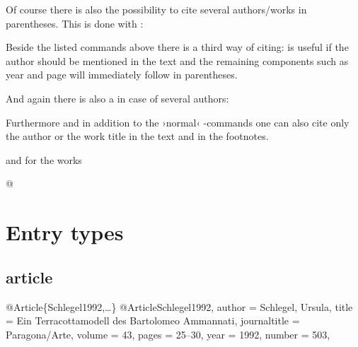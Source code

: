 \documentclass[a4paper,
10pt,
ngerman,
english
]{ltxdoc}
\begin{document}
\DescribeMacro{\parencites}
Of course there is also the possibility to cite several authors/works in parentheses.
This is done with :
 
\DescribeMacro{\textcite}
Beside the listed  commands above there is a third way of citing:
 is useful if the author should be mentioned in the text and
the remaining components such as year and page will immediately follow in parentheses. 

\DescribeMacro{\textcites}
And again there is also a  in case of several authors: 

\DescribeMacro{\citeauthor}\DescribeMacro{\citetitle}\label{citeauthor}%
Furthermore and in addition to the ›normal‹ -commands one can also cite only the author or the work title in the text and in the footnotes.
  and for the works 
\begin{code}
\citetitle*@%
\end{code} 

\section{Entry types}
\subsection{article}
\begin{bibexample}[label=Schlegel1992]{{@}Article\{Schlegel1992,…\}}
@Article{Schlegel1992,
  author       = {Schlegel, Ursula},
  title        = {Ein Terracottamodell des Bartolomeo Ammannati},
  journaltitle = {Paragona/Arte},
  volume       = {43},
  pages        = {25--30},
  year         = {1992},
  number       = {503},
}
\end{bibexample}
\end{document}
